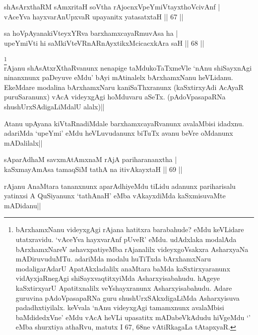 
\begin{shl}
shAsArxthaRM sAmxritaH soV\s tha rAjocnxVpeYmiVtayxthoVcivAnf | \\
vAceYva hayxvarAnUpxvaR upayanitx yatasatxtaH \hfill|| 67 || 
\end{shl}

\begin{shl}
sa hoVpAyanakiVteyxYRva barxhamxcayaRmuvAsa ha | \\
upeYmiVti hi saMkiVteVRnARnAyxtikxMcicacxkAra saH \hfill|| 68 ||  
\end{shl}

\begin{artha}
\footnote[3]{bArxhamxNanu videyxgAgi rAjana hatitxra barabahude? eMdu 
keVLidare utatxravidu. `vAceYva hayxvarAnf pUveR' eMdu. udAdxlaka 
modalAda bArxhamxNareV ashavxpatiyeMba rAjanalilx videyxgoVsakxra 
AsharxyaNa mADiruvuduMTu. adariMda modalu huTiTxda bArxhamxNaru 
modaligarAdarU ApatAkxladalilx anaMtara baMda kaSxtirxyaranunx 
vidAyxjaRnegAgi shiSayxvaqtitxyiMda Asharxyisabahudu. hAgeye 
kaSxtirxyarU Apatitxnalilx veYshayxranunx Asharxyisabahudu. Adare 
guruvina pAdoVpasapaRNa guru shushUrxSAkxdigaLiMda Asharxyisuva 
padadhxtiyilalx. keVvala `nAnu videyxgAgi tamamxnunx avalaMbisi 
baMdidedxVne' eMdu vAcA heVLi upasatitx mADabeVkAdudu hiVgeMdu 
`\stext' eMba shurxtiya athaRvu, matutx I 67, 68ne vAtiRkagaLa 
tAtapxyaR.}\\
rAjanu shAsAtxrXthaRvanunx nenapige taMdukoTaTxmeVle `nAnu shiSayxnAgi 
ninanxnunx paDeyuve eMdu' bAyi mAtinalelx bArxhamxNanu heVLidanu. 
EkeMdare modalina bArxhamxNaru kaniSaThxranunx (kaSxtirxyAdi AcAyaR 
puruSaranunx) vAcA videyxgAgi hoMduvaru aSeTx. (pAdoVpasapaRNa 
shushUrxSAdigaLiMdalU alalx)||
\end{artha}

\begin{artha}
Atanu upAyana kiVtaRnadiMdale barxhamxcayaRvanunx avalaMbisi idadxnu. 
adariMda `upeYmi' eMdu heVLuvudanunx biTuTx avanu beVre oMdanunx 
mADalilalx||
\end{artha}

\begin{shl}
sAparAdhaM savxmAtAmxnaM rAjA pariharananxtha | \\
kaSxmayAmAsa tamaqSiM tathA na itivAkayxtaH \hfill|| 69 || 
\end{shl}

\begin{artha}
rAjanu AnaMtara tananxnunx aparAdhiyeMdu tiLidu adanunx pariharisalu 
yatinxsi A QuSiyanunx `tathAnaH' eMba vAkayxdiMda kaSxmisuvaMte 
mADidanu||
\end{artha}


